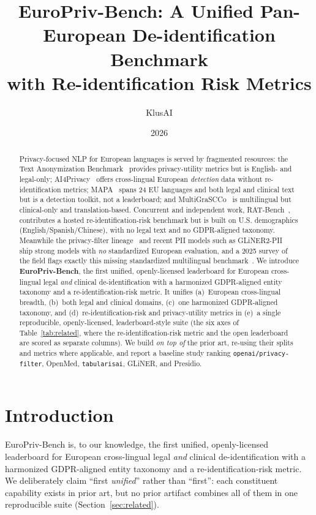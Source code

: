 \documentclass[11pt]{article}
\title{EuroPriv-Bench: A Unified Pan-European De-identification Benchmark\\
       with Re-identification Risk Metrics}
\author{KlusAI}
\date{2026}
\begin{document}
\maketitle

\begin{abstract}
Privacy-focused NLP for European languages is served by fragmented resources: the Text
Anonymization Benchmark~\cite{pilan2022tab} provides privacy-utility metrics but is
English- and legal-only; AI4Privacy~\cite{ai4privacy_openpii} offers cross-lingual European
\emph{detection} data without re-identification metrics; MAPA~\cite{mapa_toolkit} spans 24 EU
languages and both legal and clinical text but is a detection toolkit, not a leaderboard; and
MultiGraSCCo~\cite{multigrascco2026} is multilingual but clinical-only and translation-based.
Concurrent and independent work, RAT-Bench~\cite{ratbench2026}, contributes a hosted
re-identification-risk benchmark but is built on U.S. demographics
(English/Spanish/Chinese), with no legal text and no GDPR-aligned taxonomy.
Meanwhile the privacy-filter lineage~\cite{openai_privacy_filter_2026,openmed_privacy_filter_ml_2026}
and recent PII models such as GLiNER2-PII~\cite{gliner2pii2026} ship strong models with \emph{no}
standardized European evaluation, and a 2025 survey of the field flags exactly this
missing standardized multilingual benchmark~\cite{deusser2025survey}. We introduce
\textbf{EuroPriv-Bench}, the first unified, openly-licensed leaderboard for European
cross-lingual legal \emph{and} clinical de-identification with a harmonized GDPR-aligned entity
taxonomy and a re-identification-risk metric. It unifies (a)~European cross-lingual breadth,
(b)~both legal and clinical domains, (c)~one harmonized GDPR-aligned taxonomy, and
(d)~re-identification-risk and privacy-utility metrics in (e)~a single reproducible,
openly-licensed, leaderboard-style suite (the six axes of Table~\ref{tab:related}, where the
re-identification-risk metric and the open leaderboard are scored as separate columns). We build \emph{on top of} the prior art, re-using their
splits and metrics where applicable, and report a baseline study ranking
\texttt{openai/privacy-filter}, OpenMed, \texttt{tabularisai}, GLiNER, and Presidio.
\end{abstract}

\section{Introduction}
EuroPriv-Bench is, to our knowledge, the first unified, openly-licensed leaderboard for European
cross-lingual legal \emph{and} clinical de-identification with a harmonized GDPR-aligned entity
taxonomy and a re-identification-risk metric. We deliberately claim ``first \emph{unified}'' rather
than ``first'': each constituent capability exists in prior art, but no prior artifact combines all
of them in one reproducible suite (Section~\ref{sec:related}).
\end{document}

